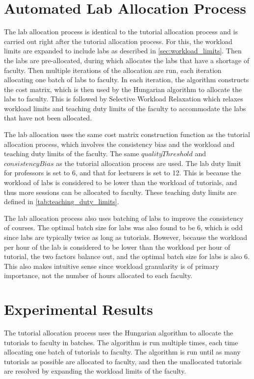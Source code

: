 \section{Automated Lab Allocation Process}

The lab allocation process is identical to the tutorial allocation process and is carried out right after the tutorial allocation process. For this, the workload limits are expanded to include labs as described in \autoref{sec:workload_limits}. Then the labs are pre-allocated, during which allocates the labs that have a shortage of faculty. Then multiple iterations of the allocation are run, each iteration allocating one batch of labs to faculty. In each iteration, the algorithm constructs the cost matrix, which is then used by the Hungarian algorithm to allocate the labs to faculty. This is followed by Selective Workload Relaxation which relaxes workload limits and teaching duty limits of the faculty to accommodate the labs that have not been allocated.

The lab allocation uses the same cost matrix construction function as the tutorial allocation process, which involves the consistency bias and the workload and teaching duty limits of the faculty. The same $qualityThreshold$ and $consistencyBias$ as the tutorial allocation process are used. The lab duty limit for professors is set to 6, and that for lecturers is set to 12. This is because the workload of labs is considered to be lower than the workload of tutorials, and thus more sessions can be allocated to faculty. These teaching duty limits are defined in \autoref{tab:teaching_duty_limits}.

The lab allocation process also uses batching of labs to improve the consistency of courses. The optimal batch size for labs was also found to be 6, which is odd since labs are typically twice as long as tutorials. However, because the workload per hour of the lab is considered to be lower than the workload per hour of tutorial, the two factors balance out, and the optimal batch size for labs is also 6. This also makes intuitive sense since workload granularity is of primary importance, not the number of hours allocated to each faculty.


\section{Experimental Results}

The tutorial allocation process uses the Hungarian algorithm to allocate the tutorials to faculty in batches. The algorithm is run multiple times, each time allocating one batch of tutorials to faculty. The algorithm is run until as many tutorials as possible are allocated to faculty, and then the unallocated tutorials are resolved by expanding the workload limits of the faculty.

